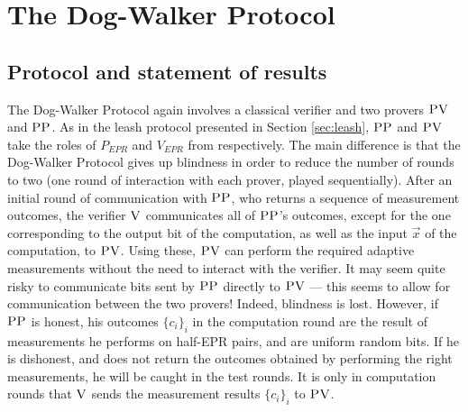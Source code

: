 \documentclass[11pt,letter]{article}
\theoremstyle{remark}
\theoremstyle{definition}
\newcommand{\ver}{\textsc{V}}
\newcommand{\pv}{\textsc{PV}}
\newcommand{\pp}{\textsc{PP}}
\newcommand{\snote}[1]{\textcolor{green}{\small {\textbf{(Stacey:} #1 \textbf{) }}}}
\begin{document}
%
%
%

\section{The Dog-Walker Protocol}
\label{sec:dog-walker}






\subsection{Protocol and statement of results}

The Dog-Walker Protocol again involves a classical verifier and two provers $\pv$ and $\pp$. As in the leash protocol presented in Section \ref{sec:leash}, $\pp$ and $\pv$ take the roles of $P_{EPR}$ and $V_{EPR}$ from \cite{broadbent15howtoverify} respectively. 
The main difference is that the Dog-Walker Protocol gives up blindness in order to reduce the number of rounds to two (one round of interaction with each prover, played sequentially). After an initial round of communication with $\pp$, who returns a sequence of measurement outcomes, the verifier $\ver$ communicates all of $\pp$'s outcomes, except for the one corresponding to the output bit of the computation, as well as the input $\vec{x}$ of the computation, to $\pv$.  Using these, $\pv$ can perform the required adaptive measurements without the need to interact with the verifier.  It may seem quite risky to communicate bits sent by $\pp$ directly to $\pv$ --- this seems to allow for communication between the two provers! Indeed, blindness is lost. However, if $\pp$ is honest, his outcomes $\{c_i\}_i$ in the computation round are the result of measurements he performs on half-EPR pairs, and are uniform random bits. If he is dishonest, and does not return the outcomes  obtained by performing the right measurements, he will be caught in the test rounds. It is only in computation rounds that $\ver$ sends the measurement results $\{c_i\}_i$ to $\pv$. 
\end{document}
